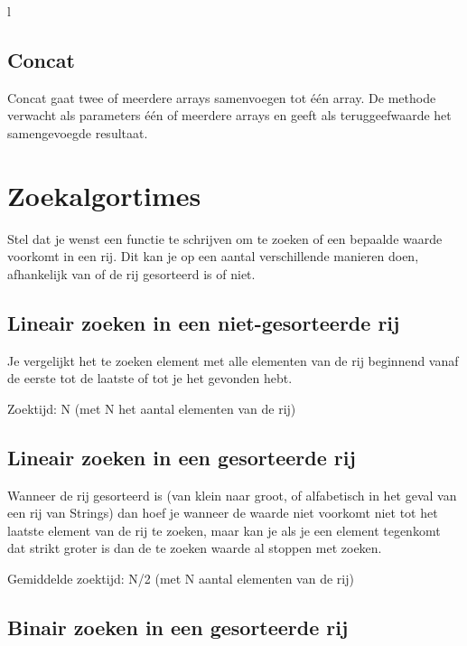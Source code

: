 l

\subsection{Concat}

Concat gaat twee of meerdere arrays samenvoegen tot \'e\'en array. De methode verwacht als parameters \'e\'en of meerdere arrays en geeft als teruggeefwaarde het samengevoegde resultaat.



\section{Zoekalgortimes}

Stel dat je wenst een functie te schrijven om te zoeken of een bepaalde waarde voorkomt  in een rij. Dit kan je op een aantal verschillende manieren doen, afhankelijk van of de rij gesorteerd is of niet.

\subsection{Lineair zoeken in een niet-gesorteerde rij}

Je vergelijkt het te zoeken element met alle elementen van de rij beginnend vanaf de eerste tot de laatste of tot je het gevonden hebt.


Zoektijd: N (met N het aantal elementen van de rij)

\subsection{Lineair zoeken in een gesorteerde rij}

Wanneer de rij gesorteerd is (van klein naar groot, of alfabetisch in het geval van een rij van Strings) dan hoef je wanneer de waarde niet voorkomt niet tot het laatste element van de rij te zoeken, maar kan je als je een element tegenkomt dat strikt groter is dan de te zoeken waarde al stoppen met zoeken.


Gemiddelde zoektijd: N/2 (met N aantal elementen van de rij)

\subsection{Binair zoeken in een gesorteerde rij}

